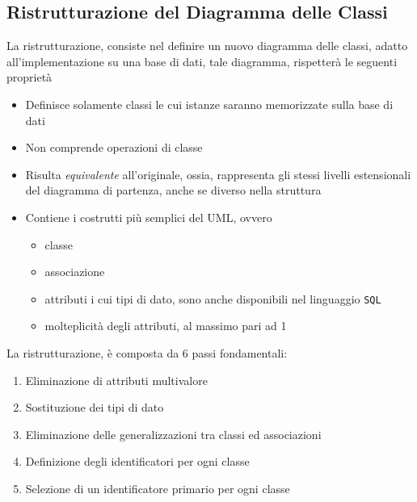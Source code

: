 \documentclass[12pt, letterpaper]{article}
\newcommand{\codee}[1]{\colorbox{white}{\texttt{#1}}}
\begin{document}
\subsection{Ristrutturazione del Diagramma delle Classi}
La ristrutturazione, consiste nel definire un nuovo diagramma delle classi, adatto all'implementazione su una 
base di dati, tale diagramma, rispetterà le seguenti proprietà\begin{itemize}
    \item Definisce solamente classi le cui istanze saranno memorizzate sulla base di dati 
    \item Non comprende operazioni di classe 
    \item Risulta \textit{equivalente} all'originale, ossia, rappresenta gli stessi livelli estensionali del diagramma 
    di partenza, anche se diverso nella struttura 
    \item Contiene i costrutti più semplici del UML, ovvero\begin{itemize}
        \item classe 
        \item associazione 
        \item attributi i cui tipi di dato, sono anche disponibili nel linguaggio \codee{SQL} 
        \item molteplicità degli attributi, al massimo pari ad 1
    \end{itemize}
\end{itemize}
La ristrutturazione, è composta da 6 passi fondamentali:\begin{enumerate}
    \item Eliminazione di attributi multivalore 
    \item Sostituzione dei tipi di dato 
    \item Eliminazione delle generalizzazioni tra classi ed associazioni
    \item Definizione degli identificatori per ogni classe 
    \item Selezione di un identificatore primario per ogni classe 
\end{enumerate}
\end{document}
